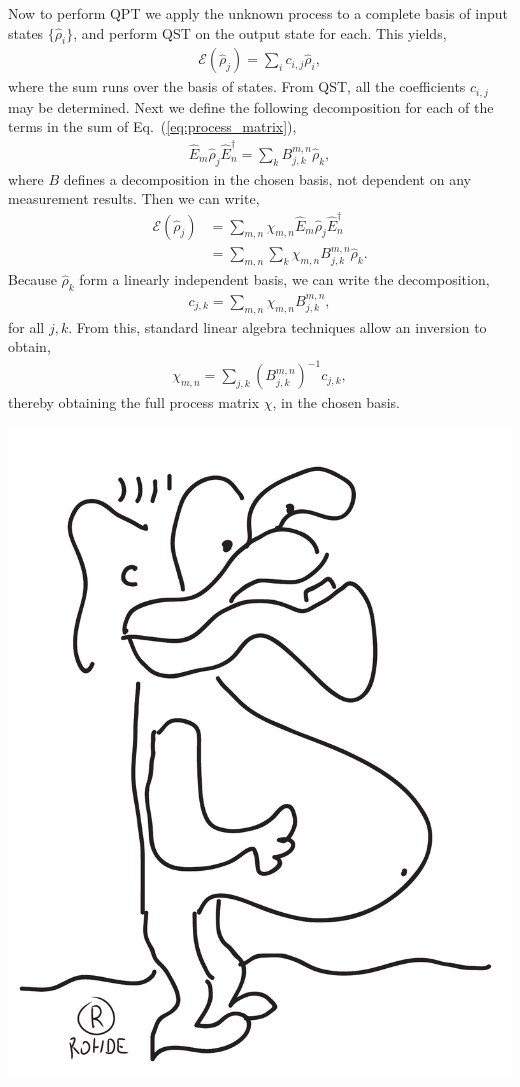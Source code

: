 \documentclass[aps, rmp, twocolumn, amsmath, amssymb, nofootinbib, superscriptaddress, longbibliography, floatfix, table-of-contents, eqsecnum]{revtex4-1}
\begin{document}
Now to perform QPT we apply the unknown process to a complete basis of input states $\{\hat\rho_i\}$, and perform QST on the output state for each. This yields,
\begin{align}
\mathcal{E}(\hat\rho_j) = \sum_{i} c_{i,j} \hat\rho_i,
\end{align}
where the sum runs over the basis of states. From QST, all the coefficients $c_{i,j}$ may be determined. Next we define the following decomposition for each of the terms in the sum of Eq.~(\ref{eq:process_matrix}),
\begin{align}
\hat{E}_m \hat\rho_j \hat{E}_n^\dag = \sum_k B^{m,n}_{j,k} \hat\rho_k,
\end{align}
where $B$ defines a decomposition in the chosen basis, not dependent on any measurement results. Then we can write,
\begin{align}
\mathcal{E}(\hat\rho_j) &= \sum_{m,n} \chi_{m,n} \hat{E}_m\hat\rho_j\hat{E}_n^\dag \nonumber \\
&= \sum_{m,n} \sum_k \chi_{m,n} B^{m,n}_{j,k} \hat\rho_k.
\end{align}
Because $\hat\rho_k$ form a linearly independent basis, we can write the decomposition,
\begin{align}
c_{j,k} = \sum_{m,n} \chi_{m,n} B_{j,k}^{m,n},
\end{align}
for all \mbox{$j,k$}. From this, standard linear algebra techniques allow an inversion to obtain,
\begin{align}
\chi_{m,n} = \sum_{j,k} (B_{j,k}^{m,n})^{-1} c_{j,k},
\end{align}
thereby obtaining the full process matrix $\chi$, in the chosen basis.

\begin{center}
	\includegraphics[width=0.6\columnwidth]{sketch_7}
\end{center}
\end{document}
